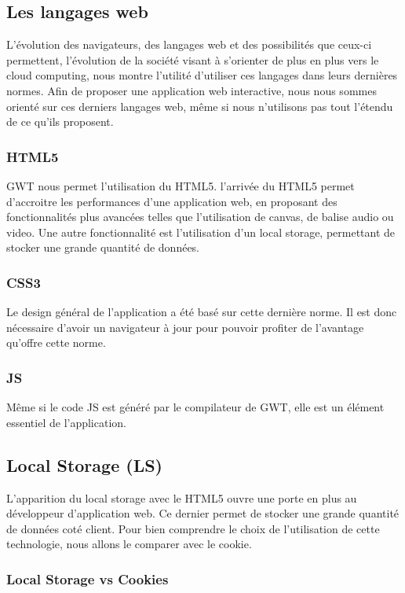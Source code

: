 \subsection{Les langages web}
L'évolution des navigateurs, des langages web et des possibilités que ceux-ci permettent, l'évolution de la société visant à s'orienter de plus en plus vers le cloud computing, nous montre l'utilité d'utiliser ces langages dans leurs dernières normes. Afin de proposer une application web interactive, nous nous sommes orienté sur ces derniers langages web, même si nous n'utilisons pas tout l'étendu de ce qu'ils proposent.

\subsubsection{HTML5}
GWT nous permet l'utilisation du HTML5. l'arrivée du HTML5 permet d'accroitre les performances d'une application web, en proposant des fonctionnalités plus avancées telles que l'utilisation de canvas, de balise audio ou video. Une autre fonctionnalité est l'utilisation d'un local storage, permettant de stocker une grande quantité de données.
\subsubsection{CSS3}
Le design général de l'application a été basé sur cette dernière norme. Il est donc nécessaire d'avoir un navigateur à jour pour pouvoir profiter de l'avantage qu'offre cette norme.

\subsubsection{JS}
Même si le code JS est généré par le compilateur de GWT, elle est un élément essentiel de l'application. 
 
\subsection{Local Storage (LS)}
L'apparition du local storage avec le HTML5 ouvre une porte en plus au développeur d'application web. Ce dernier permet de stocker une grande quantité de données coté client. Pour bien comprendre le choix de l'utilisation de cette technologie, nous allons le comparer avec le cookie.

\subsubsection{Local Storage vs Cookies}

